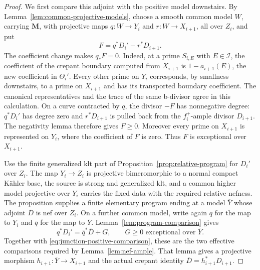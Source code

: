 \documentclass[11pt]{amsart}
\theoremstyle{definition}
\theoremstyle{remark}
\numberwithin{equation}{section}
\newcommand{\M}{\mathbf{M}}
\begin{document}
\begin{proof}
We first compare this adjoint with the positive model downstairs.  By
Lemma~\ref{lem:common-projective-models}, choose a smooth common
model $W$, carrying $\M$, with projective maps
$q:W\to Y_i$ and $r:W\to X_{i+1}$, all over $Z_i$, and put
\begin{equation}\label{eq:junction-positive-comparison}
                         F=q^*D_i'-r^*D_{i+1}.
\end{equation}
The coefficient change makes $q_*F=0$.  Indeed, at a prime $S_{i,E}$ with
$E\in\mathcal I$, the coefficient of the crepant boundary computed from
$X_{i+1}$ is $1-a_{i+1}(E)$, the new coefficient in $\Theta_i'$.
Every other prime on $Y_i$ corresponds, by smallness downstairs, to a
prime on $X_{i+1}$ and has its transported boundary coefficient.  The
canonical representatives and the trace of the same b-divisor agree in
this calculation.  On a curve contracted by $q$, the divisor $-F$ has
nonnegative degree: $q^*D_i'$ has degree zero and $r^*D_{i+1}$ is pulled
back from the $f_i^+$-ample divisor $D_{i+1}$.  The negativity
lemma therefore gives $F\geq0$.  Moreover every prime on $X_{i+1}$ is
represented on $Y_i$, where the coefficient of $F$ is zero.  Thus $F$ is
exceptional over $X_{i+1}$.

Use the finite generalized klt part of
Proposition~\ref{prop:relative-program} for $D_i'$ over $Z_i$.  The map
$Y_i\to Z_i$ is projective bimeromorphic to a normal compact K\"ahler
base, the source is strong and generalized klt, and a common higher model
projective over $Y_i$ carries the fixed data with the
required relative nefness.  The proposition supplies a finite elementary
program ending at a model $\overline Y$ whose adjoint $\overline D$ is nef
over $Z_i$.  On a further common model, write again $q$ for the map to
$Y_i$ and $\bar q$ for the map to $\overline Y$.
Lemma~\ref{lem:program-comparison} gives
\[
              q^*D_i'=\bar q^*\overline D+G,
              \qquad G\geq0\text{ exceptional over }\overline Y.
\]
Together with \eqref{eq:junction-positive-comparison}, these are the two
effective comparisons required by Lemma~\ref{lem:nef-ample}.  That lemma
gives a projective morphism $h_{i+1}:\overline Y\to X_{i+1}$ and the
actual crepant identity $\overline D=h_{i+1}^*D_{i+1}$.


\end{proof}
\end{document}
